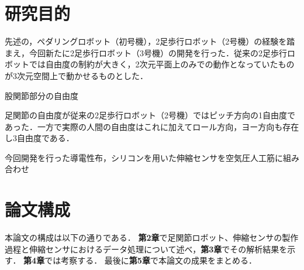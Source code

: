 
\section{研究目的}

先述の，ペダリングロボット（初号機），2足歩行ロボット（2号機）の経験を踏まえ，今回新たに2足歩行ロボット（3号機）の開発を行った．従来の2足歩行ロボットでは自由度の制約が大きく，2次元平面上のみでの動作となっていたものが3次元空間上で動かせるものとした．

股関節部分の自由度

足関節の自由度が従来の2足歩行ロボット（2号機）ではピッチ方向の1自由度であった．一方で実際の人間の自由度はこれに加えてロール方向，ヨー方向も存在し3自由度である．

今回開発を行った導電性布，シリコンを用いた伸縮センサを空気圧人工筋に組み合わせ


\section{論文構成}
本論文の構成は以下の通りである．
{\bf 第2章}で足関節ロボット、伸縮センサの製作過程と伸縮センサにおけるデータ処理について述べ，{\bf 第3章}でその解析結果を示す．
{\bf 第4章}では考察する． %
最後に{\bf 第5章}で本論文の成果をまとめる．
